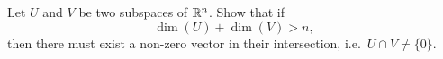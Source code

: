 \documentclass[11pt,nocut]{article}
\begin{document}
\vspace{1mm}

\begin{problem}[$\star$]
	Let $U$ and $V$ be two subspaces of $\mathbb{R}^n$. Show that if
	$$
	\dim(U) + \dim(V) > n,
	$$
	then there must exist a non-zero vector in their intersection, i.e.\ $U \cap V \neq \{0\}$.
\end{problem}
\vspace{1cm}
\centerline{}

%
%
\end{document}
